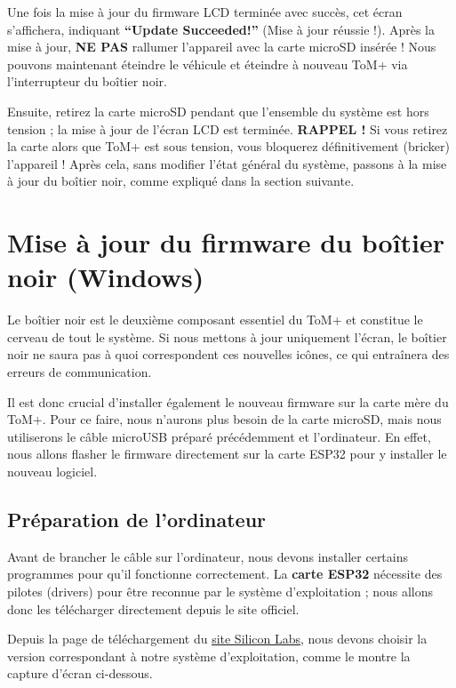 Une fois la mise à jour du firmware LCD terminée avec succès, cet écran s'affichera,
indiquant \textbf{“Update Succeeded!”} (Mise à jour réussie !). Après la mise à jour, \textbf{NE PAS}
rallumer l'appareil avec la carte microSD insérée ! Nous pouvons maintenant éteindre le véhicule et éteindre
à nouveau ToM+ via l'interrupteur du boîtier noir.

Ensuite, retirez la carte microSD pendant que l'ensemble du système est hors tension ; la mise à jour
de l'écran LCD est terminée. \textbf{RAPPEL !} Si vous retirez la carte alors que ToM+ est sous tension,
vous bloquerez définitivement (bricker) l'appareil ! Après cela, sans modifier l'état général du
système, passons à la mise à jour du boîtier noir, comme expliqué dans la section suivante.



\section{Mise à jour du firmware du boîtier noir (Windows)}

Le boîtier noir est le deuxième composant essentiel du ToM+ et constitue le cerveau de tout
le système. Si nous mettons à jour uniquement l'écran, le boîtier noir ne saura pas à quoi
correspondent ces nouvelles icônes, ce qui entraînera des erreurs de communication.

Il est donc crucial d'installer également le nouveau firmware sur la carte mère du ToM+. Pour ce
faire, nous n'aurons plus besoin de la carte microSD, mais nous utiliserons le câble microUSB
préparé précédemment et l'ordinateur. En effet, nous allons flasher le firmware directement sur
la carte ESP32 pour y installer le nouveau logiciel.


\subsection{Préparation de l'ordinateur}

Avant de brancher le câble sur l'ordinateur, nous devons installer certains programmes pour qu'il
fonctionne correctement. La \textbf{carte ESP32} nécessite des pilotes (drivers) pour être reconnue par le
système d'exploitation ; nous allons donc les télécharger directement depuis le site officiel.

Depuis la page de téléchargement du \href{https://www.silabs.com/software-and-tools/usb-to-uart-bridge-vcp-drivers?tab=downloads}{site Silicon Labs},
nous devons choisir la version correspondant à notre système d'exploitation, comme le montre la capture d'écran ci-dessous.

